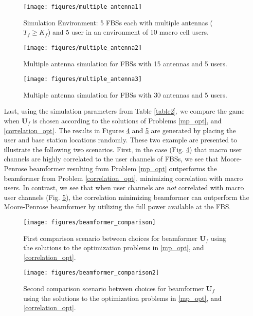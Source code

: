 \begin{figure}[H]
	\texttt{[image: figures/multiple\_antenna1]}
	  \caption{Simulation Environment: 5 FBSs each with multiple antennas ($T_f \geq K_f$) and 5 user in an environment of 10 macro cell users.}
	  \label{multiple_antenna1}
\end{figure}

\begin{figure}[H]
	\texttt{[image: figures/multiple\_antenna2]}
	  \caption{Multiple antenna simulation for FBSs with 15 antennas and 5 users.
	  }
	  \label{multiple_antenna2}
\end{figure}

\begin{figure}[H]
	\texttt{[image: figures/multiple\_antenna3]}
	  \caption{Multiple antenna simulation for FBSs with 30 antennas and 5 users.
	  }
	  \label{multiple_antenna3}
\end{figure}


Last, using the simulation parameters from Table \ref{table2}, we compare the game when $\mathbf{U}_f$ is chosen according to the solutions of Problems \ref{mp_opt}, and \ref{correlation_opt}. The results in Figures \ref{beamformer_comparison} and \ref{beamformer_comparison2} are generated by placing the user and base station locations randomly. These two example are presented to illustrate the following two scenarios. First, in the case (Fig. \ref{beamformer_comparison}) that macro user channels are highly correlated to the user channels of FBSs, we see that Moore-Penrose beamformer resulting from Problem \ref{mp_opt} outperforms the beamformer from Problem \ref{correlation_opt}, minimizing correlation with macro users. In contrast, we see that when user channels are \emph{not} correlated with macro user channels (Fig. \ref{beamformer_comparison2}), the correlation minimizing beamformer can outperform the Moore-Penrose beamformer by utilizing the full power available at the FBS.  

\begin{figure}[H]
	\texttt{[image: figures/beamformer\_comparison]}
	  \caption{First comparison scenario between choices for beamformer $\mathbf{U}_f$ using the solutions to the optimization problems in \ref{mp_opt}, and \ref{correlation_opt}.}
	  \label{beamformer_comparison}
\end{figure}

\begin{figure}[H]
	\texttt{[image: figures/beamformer\_comparison2]}
	  \caption{Second comparison scenario between choices for beamformer $\mathbf{U}_f$ using the solutions to the optimization problems in \ref{mp_opt}, and \ref{correlation_opt}.}
	  \label{beamformer_comparison2}
\end{figure}


